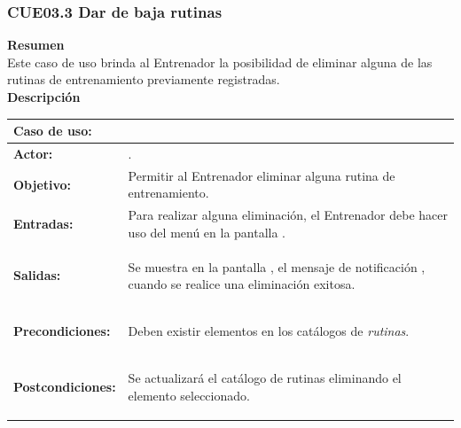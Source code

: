 \subsubsection{CUE03.3 Dar de baja rutinas}
\label{cu:CUE03.3}

\textbf{\textcolor[rgb]{0, 0, 0.545098}{Resumen}} \\

Este caso de uso brinda al Entrenador la posibilidad de eliminar alguna de las rutinas de entrenamiento previamente registradas.\\

\textbf{\textcolor[rgb]{0, 0, 0.545098}{Descripción}}

\begin{table}[H]
\centering
\begin{tabular}{| l | p{12 cm} |}
\hline
\rowcolor[rgb]{0.529412, 0.807843, 0.980392} {\textbf{Caso de uso:}} & \hspace{7em}{\textbf{CUE03.3 Dar de baja rutinas}}\\
\hline
\textbf{Actor:} &  \nameref{act:Entrenador}. \\
\hline
\textbf{Objetivo:} & Permitir al Entrenador eliminar alguna rutina de entrenamiento.\\
\hline
\textbf{Entradas:} & Para realizar alguna eliminación, el Entrenador debe hacer uso del menú \nameref{menu:ME03} en la pantalla \nameref{pant:IUE03}. \\
\hline
\textbf{Salidas:} & \vspace{-2mm}	%
					\begin{compactitem}
						\setlength\itemsep{-0.25em}
						\item Se muestra en la pantalla \nameref{pant:IUE03}, el mensaje de notificación \nameref{msj:MSG01}, cuando se realice una eliminación exitosa.
					\end{compactitem}\\
\hline
\textbf{Precondiciones:} & 	\vspace{-2mm}	%
							\begin{compactitem}
								\setlength\itemsep{-0.25em}
								\item Deben existir elementos en los catálogos de \textit{rutinas}.
							\end{compactitem}\\
\hline
\textbf{Postcondiciones:} & \vspace{-2mm}	%
							\begin{compactitem}
								\item Se actualizará el catálogo de rutinas eliminando el elemento seleccionado.
							\end{compactitem}\\
							

\end{tabular}
\end{table}
